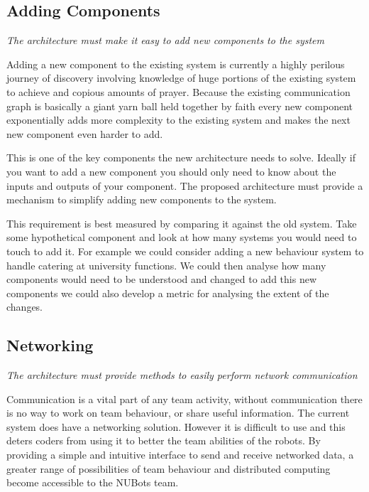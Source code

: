 \documentclass[english,12pt]{scrartcl}
\newcommand{\requirement}[1]{\textit{#1}}
\begin{document}
        \subsection{Adding Components}
            \requirement{The architecture must make it easy to add new components to the system}
            
            Adding a new component to the existing system is currently a highly perilous journey of
            discovery involving knowledge of huge portions of the existing system to achieve and
            copious amounts of prayer. Because the existing communication graph is basically a giant 
            yarn ball held together by faith every new component exponentially adds more complexity
            to the existing system and makes the next new component even harder to add.
            
            This is one of the key components the new architecture needs to solve. Ideally if you
            want to add a new component you should only need to know about the inputs and outputs of
            your component. The proposed architecture must provide a mechanism to simplify adding
            new components to the system.
            
            This requirement is best measured by comparing it against the old system. Take some
            hypothetical component and look at how many systems you would need to touch to add it.
            For example we could consider adding a new behaviour system to handle catering at
            university functions. We could then analyse how many components would need to be
            understood and changed to add this new components we could also develop a metric for
            analysing the extent of the changes.
            
        
        \subsection{Networking}
            \requirement{The architecture must provide methods to easily perform network
            communication}
            
            Communication is a vital part of any team activity, without communication there is no
            way to work on team behaviour, or share useful information. The current system does have
            a networking solution. However it is difficult to use and this deters coders from using
            it to better the team abilities of the robots. By providing a simple and intuitive
            interface to send and receive networked data, a greater range of possibilities of team
            behaviour and distributed computing become accessible to the NUBots team.
            
\end{document}
